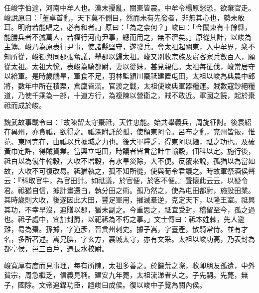 
\begin{pinyinscope}
任峻字伯達，河南中牟人也。漢末擾亂，關東皆震。中牟令楊原愁恐，欲棄官走。峻說原曰：「董卓首亂，天下莫不側目，然而未有先發者，非無其心也，勢未敢耳。明府若能唱之，必有和者。」原曰：「為之柰何？」峻曰：「今關東有十餘縣，能勝兵者不減萬人，若權行河南尹事，總而用之，無不濟矣。」原從其計，以峻為主簿。峻乃為原表行尹事，使諸縣堅守，遂發兵。會太祖起關東，入中牟界，衆不知所從，峻獨與同郡張奮議，舉郡以歸太祖。峻又別收宗族及賔客家兵數百人，願從太祖。太祖大恱，表峻為騎都尉，妻以從妹，甚見親信。太祖每征伐，峻常居守以給軍。是時歲饑旱，軍食不足，羽林監潁川棗祗建置屯田，太祖以峻為典農中郎將，數年中所在積粟，倉廩皆滿。官渡之戰，太祖使峻典軍器糧運。賊數寇鈔絕糧道，乃使千乘為一部，十道方行，為複陳以營衞之，賊不敢近。軍國之饒，起於棗祗而成於峻。

魏武故事載令曰：「故陳留太守棗祗，天性忠能。始共舉義兵，周旋征討。後袁紹在兾州，亦貪祗，欲得之。祗深附託於孤，使領東阿令。呂布之亂，兖州皆叛，惟范、東阿完在，由祗以兵據城之力也。後大軍糧乏，得東阿以繼，祗之功也。及破黃巾定許，得賊資業。當興立屯田，時議者皆言當計牛輸穀，佃科以定。施行後，祗白以為僦牛輸穀，大收不增穀，有水旱災除，大不便。反覆來說，孤猶以為當如故，大收不可復改易。祗猶執之，孤不知所從，使與荀令君議之。時故軍祭酒侯聲云：『科取官牛，為官田計。如祗議，於官便，於客不便。』聲懷此云云，以疑令君。祗猶自信，據計畫還白，執分田之術。孤乃然之，使為屯田都尉，施設田業。其時歲則大收，後遂因此大田，豐足軍用，摧滅羣逆，克定天下，以隆王室。祗興其功，不幸早沒，追贈以郡，猶未副之。今重思之，祗宜受封，稽留至今，孤之過也。祗子處中，宜加封爵，以祀祗為不朽之事。」文士傳曰：祗本姓棘，先人避難，易為棗。孫據，字道彥，晉兾州刺史。據子嵩，字臺產，散騎常侍。並有才名，多所著述。嵩兄腆，字玄方，襄城太守，亦有文采。太祖以峻功高，乃表封為都亭侯，邑三百戶，遷長水校尉。

峻寬厚有度而見事理，每有所陳，太祖多善之。於饑荒之際，收卹朋友孤遺，中外貧宗，周急繼乏，信義見稱。建安九年薨，太祖流涕者乆之。子先嗣。先薨，無子，國除。文帝追錄功臣，謚峻曰成侯。復以峻中子覽為關內侯。


\end{pinyinscope}